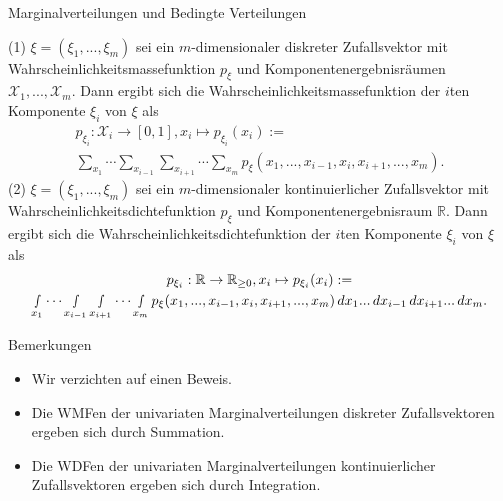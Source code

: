 \documentclass[
  8pt,
  ignorenonframetext,
]{beamer}
\providecommand{\tightlist}{%
  \setlength{\itemsep}{0pt}\setlength{\parskip}{0pt}}
\begin{document}
\begin{frame}{Marginalverteilungen und Bedingte Verteilungen}
\protect\hypertarget{marginalverteilungen-und-bedingte-verteilungen-1}{}
\footnotesize
\begin{theorem}
\justifying
\normalfont
(1) $\xi= (\xi_1,...,\xi_m)$ sei ein $m$-dimensionaler diskreter Zufallsvektor
mit Wahrscheinlichkeitsmassefunktion $p_\xi$ und Komponentenergebnisräumen
$\mathcal{X}_1, ..., \mathcal{X}_m$. Dann ergibt sich die
Wahrscheinlichkeitsmassefunktion der $i$ten Komponente $\xi_i$ von $\xi$ als
\begin{multline}
p_{\xi_i} : \mathcal{X}_i \to [0,1], x_i \mapsto p_{\xi_i}(x_i) := \\
\sum_{x_1} \cdots \sum_{x_{i-1}} \sum_{x_{i+1}} \cdots \sum_{x_m} p_\xi(x_1,...,x_{i-1},x_i,x_{i+1}, ...,x_m).
\end{multline}
(2) $\xi= (\xi_1,...,\xi_m)$ sei ein $m$-dimensionaler kontinuierlicher Zufallsvektor
mit Wahrscheinlichkeitsdichtefunktion $p_\xi$ und Komponentenergebnisraum $\mathbb{R}$.
Dann ergibt sich die Wahrscheinlichkeitsdichtefunktion der $i$ten Komponente $\xi_i$ von $\xi$ als
\begin{multline}
p_{\xi_i} : \mathbb{R} \to \mathbb{R}_{\ge 0},  x_i \mapsto p_{\xi_i}(x_i) :=  \\
\smallint_{x_1} \cdots \smallint_{x_{i-1}} \smallint_{x_{i+1}} \cdots \smallint_{x_m}
   p_\xi(x_1,..., x_{i-1},x_i,x_{i+1}, ...,x_m)
   \,dx_1...\,dx_{i-1}\,dx_{i+1}...\,dx_m.
\end{multline}
\end{theorem}
\vspace{-2mm}

Bemerkungen \vspace{-1mm}

\begin{itemize}
\tightlist
\item
  \justifying Wir verzichten auf einen Beweis.
\item
  Die WMFen der univariaten Marginalverteilungen diskreter
  Zufallsvektoren ergeben sich durch Summation.
\item
  Die WDFen der univariaten Marginalverteilungen kontinuierlicher
  Zufallsvektoren ergeben sich durch Integration.
\end{itemize}
\end{frame}
\end{document}
